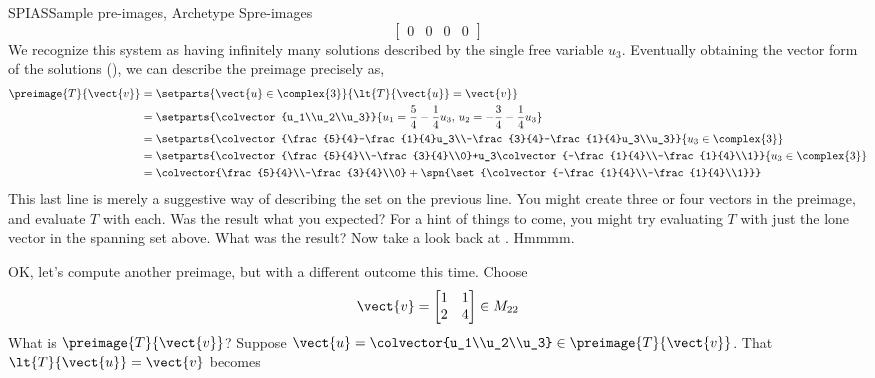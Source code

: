 \begin{example}{SPIAS}{Sample pre-images, Archetype S}{pre-images}
\begin{equation*}
\begin{bmatrix}
0 & 0 & 0 &  0
\end{bmatrix}
\end{equation*}
%
We recognize this system as having infinitely many solutions described by the single free variable $u_3$.  Eventually obtaining the vector form of the solutions (), we can describe the preimage precisely as,
%
\begin{align*}
\preimage{T}{\vect{v}}&=\setparts{\vect{u}\in\complex{3}}{\lt{T}{\vect{u}}=\vect{v}}\\
&=\setparts{\colvector{u_1\\u_2\\u_3}}{u_1=\frac{5}{4}-\frac{1}{4}u_3,\,u_2=-\frac{3}{4}-\frac{1}{4}u_3}\\
&=\setparts{\colvector{\frac{5}{4}-\frac{1}{4}u_3\\-\frac{3}{4}-\frac{1}{4}u_3\\u_3}}{u_3\in\complex{3}}\\
&=\setparts{\colvector{\frac{5}{4}\\-\frac{3}{4}\\0}+u_3\colvector{-\frac{1}{4}\\-\frac{1}{4}\\1}}{u_3\in\complex{3}}\\
&=\colvector{\frac{5}{4}\\-\frac{3}{4}\\0}+\spn{\set{\colvector{-\frac{1}{4}\\-\frac{1}{4}\\1}}}
\end{align*}
%
This last line is merely a suggestive way of describing the set on the previous line.  You might create three or four vectors in the preimage, and evaluate $T$ with each.  Was the result what you expected?  For a hint of things to come, you might try evaluating $T$ with just the lone vector in the spanning set above.  What was the result?  Now take a look back at .  Hmmmm.\par
%
OK, let's compute another preimage, but with a different outcome this time.
Choose
%
\begin{equation*}
\vect{v}=
\begin{bmatrix}
1&1\\2&4
\end{bmatrix}
\in M_{22}
\end{equation*}
%
What is $\preimage{T}{\vect{v}}$?  Suppose $\vect{u}=\colvector{u_1\\u_2\\u_3}\in\preimage{T}{\vect{v}}$.  That $\lt{T}{\vect{u}}=\vect{v}$ becomes

\end{example}
